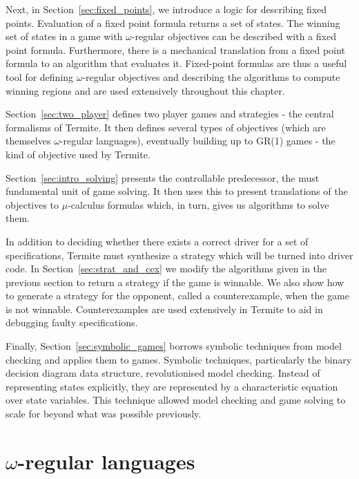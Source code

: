 Next, in Section~\ref{sec:fixed_points}, we introduce a logic for describing fixed points. Evaluation of a fixed point formula returns a set of states. The winning set of states in a game with $\omega$-regular objectives can be described with a fixed point formula. Furthermore, there is a mechanical translation from a fixed point formula to an algorithm that evaluates it. Fixed-point formulas are thus a useful tool for defining $\omega$-regular objectives and describing the algorithms to compute winning regions and are used extensively throughout this chapter.

Section~\ref{sec:two_player} defines two player games and strategies - the central formalisms of Termite. It then defines several types of objectives (which are themselves $\omega$-regular languages), eventually building up to GR(1) games - the kind of objective used by Termite.

Section~\ref{sec:intro_solving} presents the controllable predecessor, the must fundamental unit of game solving. It then uses this to present translations of the objectives to $\mu$-calculus formulas which, in turn, gives us algorithms to solve them.

In addition to deciding whether there exists a correct driver for a set of specifications, Termite must synthesize a strategy which will be turned into driver code. In Section~\ref{sec:strat_and_cex} we modify the algorithms given in the previous section to return a strategy if the game is winnable. We also show how to generate a strategy for the opponent, called a counterexample, when the game is not winnable. Counterexamples are used extensively in Termite to aid in debugging faulty specifications.

Finally, Section~\ref{sec:symbolic_games} borrows symbolic techniques from model checking and applies them to games. Symbolic techniques, particularly the binary decision diagram data structure, revolutionised model checking. Instead of representing states explicitly, they are represented by a characteristic equation over state variables. This technique allowed model checking and game solving to scale for beyond what was possible previously.

\section{$\omega$-regular languages}
\label{sec:omega_regular}


